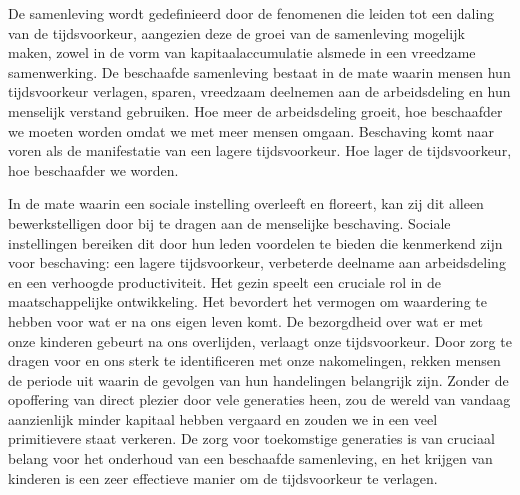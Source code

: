 \documentclass[
  a5paper,
  smalldemyvopaper,11pt,twoside,onecolumn,openright,extrafontsizes,
hidelinks]{memoir}
\begin{document}
De samenleving wordt gedefinieerd door de fenomenen die leiden tot een
daling van de tijdsvoorkeur, aangezien deze de groei van de samenleving
mogelijk maken, zowel in de vorm van kapitaalaccumulatie alsmede in een
vreedzame samenwerking. De beschaafde samenleving bestaat in de mate
waarin mensen hun tijdsvoorkeur verlagen, sparen, vreedzaam deelnemen
aan de arbeidsdeling en hun menselijk verstand gebruiken. Hoe meer de
arbeidsdeling groeit, hoe beschaafder we moeten worden omdat we met meer
mensen omgaan. Beschaving komt naar voren als de manifestatie van een
lagere tijdsvoorkeur. Hoe lager de tijdsvoorkeur, hoe beschaafder we
worden.

In de mate waarin een sociale instelling overleeft en floreert, kan zij
dit alleen bewerkstelligen door bij te dragen aan de menselijke
beschaving. Sociale instellingen bereiken dit door hun leden voordelen
te bieden die kenmerkend zijn voor beschaving: een lagere tijdsvoorkeur,
verbeterde deelname aan arbeidsdeling en een verhoogde productiviteit.
Het gezin speelt een cruciale rol in de maatschappelijke ontwikkeling.
Het bevordert het vermogen om waardering te hebben voor wat er na ons
eigen leven komt. De bezorgdheid over wat er met onze kinderen gebeurt
na ons overlijden, verlaagt onze tijdsvoorkeur. Door zorg te dragen voor
en ons sterk te identificeren met onze nakomelingen, rekken mensen de
periode uit waarin de gevolgen van hun handelingen belangrijk zijn.
Zonder de opoffering van direct plezier door vele generaties heen, zou
de wereld van vandaag aanzienlijk minder kapitaal hebben vergaard en
zouden we in een veel primitievere staat verkeren. De zorg voor
toekomstige generaties is van cruciaal belang voor het onderhoud van een
beschaafde samenleving, en het krijgen van kinderen is een zeer
effectieve manier om de tijdsvoorkeur te verlagen.
\end{document}
